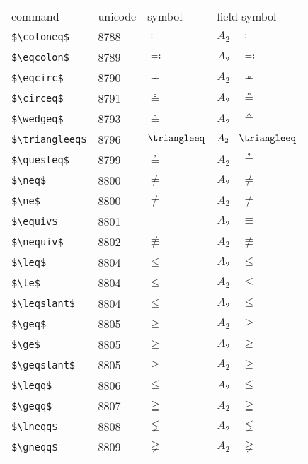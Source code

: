 \documentclass{article}
\begin{document}
\begin{table}
\begin{center}
\begin{tabular}{llll}
 command               & unicode & symbol         & field symbol\\
 \verb#$\coloneq$#     & 8788    & $\coloneq$     & $A_2\quad \coloneq$\\
 \verb#$\eqcolon$#     & 8789    & $\eqcolon$     & $A_2\quad \eqcolon$\\
 \verb#$\eqcirc$#      & 8790    & $\eqcirc$      & $A_2\quad \eqcirc$\\
 \verb#$\circeq$#      & 8791    & $\circeq$      & $A_2\quad \circeq$\\
 \verb#$\wedgeq$#      & 8793    & $\wedgeq$      & $A_2\quad \wedgeq$\\
 \verb#$\triangleeq$#  & 8796    & $\triangleeq$  & $A_2\quad \triangleeq$\\
 \verb#$\questeq$#     & 8799    & $\questeq$     & $A_2\quad \questeq$\\
 \verb#$\neq$#         & 8800    & $\neq$         & $A_2\quad \neq$\\
 \verb#$\ne$#          & 8800    & $\ne$          & $A_2\quad \ne$\\
 \verb#$\equiv$#       & 8801    & $\equiv$       & $A_2\quad \equiv$\\
 \verb#$\nequiv$#      & 8802    & $\nequiv$      & $A_2\quad \nequiv$\\
 \verb#$\leq$#         & 8804    & $\leq$         & $A_2\quad \leq$\\
 \verb#$\le$#          & 8804    & $\le$          & $A_2\quad \le$\\
 \verb#$\leqslant$#    & 8804    & $\leqslant$    & $A_2\quad \leqslant$\\
 \verb#$\geq$#         & 8805    & $\geq$         & $A_2\quad \geq$\\
 \verb#$\ge$#          & 8805    & $\ge$          & $A_2\quad \ge$\\
 \verb#$\geqslant$#    & 8805    & $\geqslant$    & $A_2\quad \geqslant$\\
 \verb#$\leqq$#        & 8806    & $\leqq$        & $A_2\quad \leqq$\\
 \verb#$\geqq$#        & 8807    & $\geqq$        & $A_2\quad \geqq$\\
 \verb#$\lneqq$#       & 8808    & $\lneqq$       & $A_2\quad \lneqq$\\
 \verb#$\gneqq$#       & 8809    & $\gneqq$       & $A_2\quad \gneqq$\\

\end{tabular}
\end{center}
\end{table}
\end{document}

